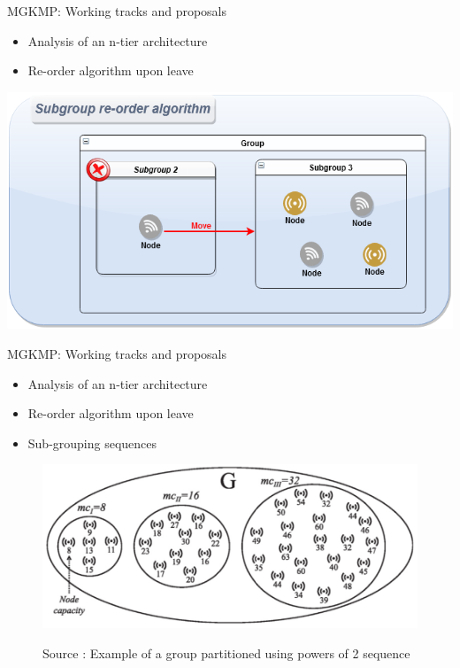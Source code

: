 \documentclass{beamer}
\begin{document}
\begin{frame}{MGKMP: Working tracks and proposals}
	\begin{itemize}
		\item Analysis of an n-tier architecture
		\item Re-order algorithm upon leave
	\end{itemize}
	\vfill
	\centering
	\includegraphics[scale=0.37]{figures/mgkmp/reorder.png}
\end{frame}

\begin{frame}{MGKMP: Working tracks and proposals}
	\begin{itemize}
		\item Analysis of an n-tier architecture
		\item Re-order algorithm upon leave
		\item Sub-grouping sequences
	\end{itemize}
	\vfill
	\centering
	\begin{figure}
		\centering
		\includegraphics[scale=0.37]{figures/mgkmp/power2.png}\\
		\caption{Source \cite{kandi_versatile_2020}: Example of a group partitioned using powers of 2
sequence}
	\end{figure}
\end{frame}
\end{document}
